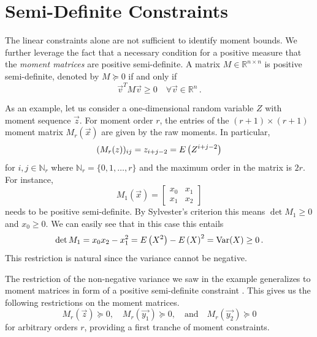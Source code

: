 \section{Semi-Definite Constraints}
The linear constraints alone are not sufficient to identify moment bounds.
We further leverage the fact that a necessary condition for a positive measure that the \emph{moment matrices}
are positive semi-definite.
A matrix $M\in\mathbb{R}^{n\times n}$ is positive semi-definite, denoted by  $M\succeq 0$ if and only if
\[
	{\vec v}^T M{\vec v} \geq 0\quad \forall \vec v\in\mathbb{R}^n\,.
\]
\begin{example}
As an example, let us consider a one-dimensional random variable $Z$
with moment sequence $\vec z$.
For  moment order $r$,
the entries of the $(r+1)\times (r+1)$ moment matrix $M_r(\vec x)$ are given by
the raw moments.
In particular, 
\[ 
	(M_r({z}))_{ij}=z_{i+j-2}={E}\left(Z^{i+j-2}\right)
\]
for
$i,j\in\mathbb{N}_r$ where $\mathbb{N}_r=\{0,1,\dots,r\}$ and the maximum order in the matrix is $2r$.
For instance,
\begin{equation}
\label{eq:m1_dim}
    M_1(\vec x) =
    \begin{bmatrix}
    x_0 & x_1 \\
    x_1 & x_2
    \end{bmatrix}
\end{equation}
needs to be positive semi-definite. By Sylvester's criterion this means $\det
M_1\geq 0$ and $x_0\geq 0$.
We can easily see that in this case this entails
	\[
\det M_1=x_0x_2 - x_1^2={E}\left(X^2\right)-{E}\left(X\right)^2
=\operatorname*{Var}({X})
\geq 0\,.
\]
This restriction is natural since the variance cannot be negative.
\end{example}
The restriction of the non-negative variance we saw in the example generalizes
to moment matrices in form of a positive semi-definite constraint \parencite{parrilo2003semidefinite}.
This gives us the following restrictions on the moment matrices.
\begin{equation}\label{eq:sd_constraints}
M_r(\vec{z})\succeq 0, \quad M_r(\vec{y_1})\succeq 0,\quad\text{and}\quad M_r(\vec{y_2})\succeq 0
\end{equation}
for arbitrary orders $r$, providing a first tranche of moment constraints.

